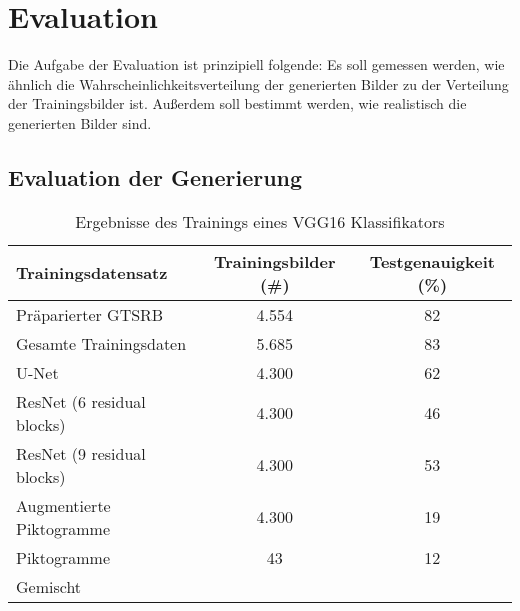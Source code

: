 \chapter{Evaluation}
Die Aufgabe der Evaluation ist prinzipiell folgende: Es soll gemessen werden, wie ähnlich die Wahrscheinlichkeitsverteilung der generierten Bilder zu der Verteilung der Trainingsbilder ist. Außerdem soll bestimmt werden, wie realistisch die generierten Bilder sind.

\label{chap:Evaluation}
\section{Evaluation der Generierung}


\begin{table}[H]
	\centering
	\begin{tabular}{|l|c|c|}
	\hline
	Trainingsdatensatz & Trainingsbilder (\#) & Testgenauigkeit (\%) \\ \hline \hline
	Präparierter GTSRB & 4.554 & 82 \\ \hline
   Gesamte Trainingsdaten & 5.685 & 83 \\ \hline \hline
   U-Net & 4.300 & 62 \\ \hline
	ResNet (6 residual blocks) & 4.300 & 46 \\ \hline
   ResNet (9 residual blocks) & 4.300 & 53 \\ \hline \hline
	Augmentierte Piktogramme & 4.300 & 19 \\ \hline
   Piktogramme & 43 & 12 \\ \hline \hline
	Gemischt & \\ \hline
	\end{tabular}
	\caption{Ergebnisse des Trainings eines VGG16 Klassifikators}
\end{table}

